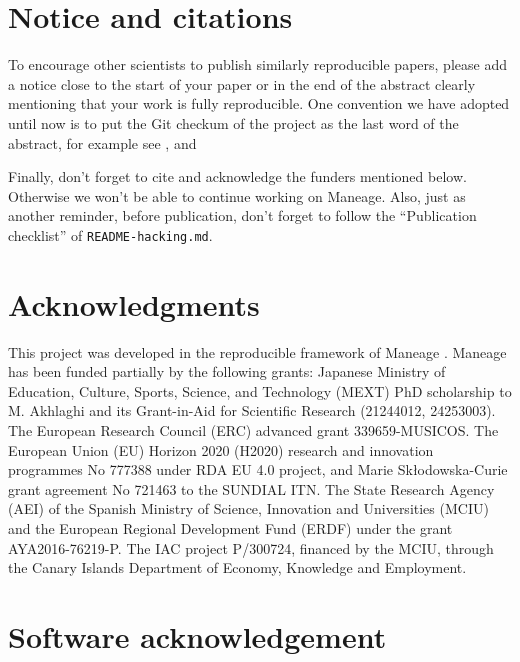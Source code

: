 \documentclass[10pt, twocolumn]{article}
\begin{document}
\section{Notice and citations}
To encourage other scientists to publish similarly reproducible papers,
please add a notice close to the start of your paper or in the end of the
abstract clearly mentioning that your work is fully reproducible. One
convention we have adopted until now is to put the Git checkum of the
project as the last word of the abstract, for example see
\citet{akhlaghi19}, \citet{infantesainz20} and \citet{maneage}

Finally, don't forget to cite \citet{maneage} and acknowledge the
funders mentioned below. Otherwise we won't be able to continue working on
Maneage. Also, just as another reminder, before publication, don't forget
to follow the ``Publication checklist'' of \texttt{README-hacking.md}.





\section{Acknowledgments}

This project was developed in the reproducible framework of Maneage
\citep[\emph{Man}aging data lin\emph{eage},][]{maneage}. Maneage has been
funded partially by the following grants: Japanese Ministry of Education,
Culture, Sports, Science, and Technology (MEXT) PhD scholarship to
M. Akhlaghi and its Grant-in-Aid for Scientific Research (21244012,
24253003). The European Research Council (ERC) advanced grant
339659-MUSICOS. The European Union (EU) Horizon 2020 (H2020) research and
innovation programmes No 777388 under RDA EU 4.0 project, and Marie
Sk\l{}odowska-Curie grant agreement No 721463 to the SUNDIAL ITN. The State
Research Agency (AEI) of the Spanish Ministry of Science, Innovation and
Universities (MCIU) and the European Regional Development Fund (ERDF) under
the grant AYA2016-76219-P. The IAC project P/300724, financed by the MCIU,
through the Canary Islands Department of Economy, Knowledge and Employment.

\printbibliography

\appendix

\section{Software acknowledgement}


\end{document}
